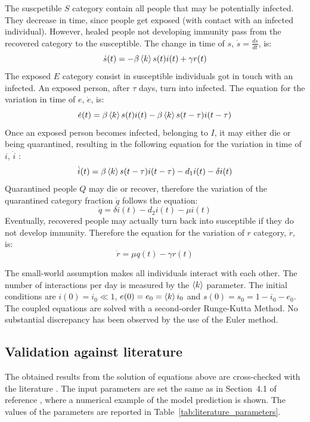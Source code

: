 The suscpetible $S$ category contain all people that may be potentially infected. They decrease in time, since people get exposed (with contact with an infected individual). However, healed people not developing immunity pass from the recovered category to the susceptible. The change in time of $s$, $\dot{s} = \frac{ds}{dt}$, is:
\begin{equation}
\dot{s} (t)= -\beta\braket{k}s(t)i(t)+\gamma{r(t)} 
\end{equation} 
The exposed $E$ category consist in susceptible individuals got in touch with an infected. An exposed person, after $\tau$ days, turn into infected. The equation for the variation in time of $e$, $\dot{e}$, is:
\begin{equation}
\dot{e} (t)= \beta\braket{k}s(t)i(t) - \beta\braket{k}s(t-\tau)i(t-\tau) 
\end{equation} 
Once an exposed person becomes infected, belonging to $I$, it may either die or being quarantined, resulting in the following equation for the variation in time of $i$, $\dot{i}$ :
\begin{equation}
\dot{i} (t)= \beta\braket{k}s(t-\tau)i(t-\tau) - d_1i(t) - \delta {i(t)}
\label{eqn:idot}
\end{equation} 
Quarantined people $Q$ may die or recover, therefore the variation of the quarantined category fraction $\dot{q}$ follows the equation:
\begin{equation}
\dot{q} = \delta{i(t)} - d_2{i(t)} - \mu{i(t)}
\end{equation}
Eventually, recovered people may actually turn back into susceptible  if they do not develop immunity. Therefore the equation for the variation of $r$ category, $\dot{r}$, is:
\begin{equation}
\dot{r} = \mu{q(t)}-\gamma{r(t)}
\end{equation}

The small-world assumption makes all individuals interact with each other. The number of interactions per day is measured by the $\braket{k}$ parameter. The initial conditions are $i(0) = i_0 \ll 1$, $e(0) = e_0 = \braket{k}i_0$ and $s(0) = s_0 = 1-i_0-e_0$. The coupled equations are solved with a second-order Runge-Kutta Method. No substantial discrepancy has been observed by the use of the Euler method.


\subsection{Validation against literature}
\label{ssec:literature}
The obtained results from the solution of equations above are cross-checked with the literature \cite{MingLiu,MingLiuOld}. The input parameters are set the same as in Section~4.1 of reference \cite{MingLiu}, where a numerical example of the model prediction is shown. The values of the parameters are reported in Table~\ref{tab:literature_parameters}.\\

